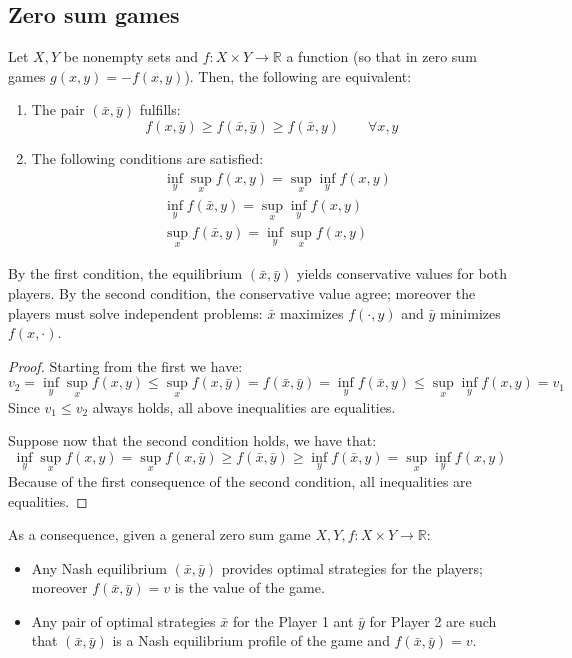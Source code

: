 \subsection{Zero sum games}
\begin{theorem}
    Let $X,Y$ be nonempty sets and $f:X\times Y \rightarrow \mathbb{R}$ a function (so that in zero sum games $g(x,y)=-f(x,y)$). 
    Then, the following are equivalent: 
    \begin{enumerate}
        \item The pair $(\bar{x},\bar{y})$ fulfills: 
            \[f(x,\bar{y})\geq f(\bar{x},\bar{y})\geq f(\bar{x},y)\qquad\forall x,y \]
        \item The following conditions are satisfied: 
        \begin{align*}
            &\inf_y\sup_x f(x,y)=\sup_x\inf_y f(x,y) \\
            &\inf_y f(\bar{x},y)=\sup_x\inf_y f(x,y) \\
            &\sup_x f(\bar{x},y)=\inf_y\sup_x f(x,y)
        \end{align*}
    \end{enumerate}
\end{theorem}
\noindent By the first condition, the equilibrium $(\bar{x},\bar{y})$ yields conservative values for both players. 
By the second condition, the conservative value agree; moreover the players must solve independent problems: $\bar{x}$ maximizes $f(\cdot,y)$ and $\bar{y}$ minimizes $f(x,\cdot)$.
\begin{proof}
    Starting from the first we have: 
    \[v_2=\inf_y\sup_x f(x,y)\leq \sup_x f(x, \bar{y})=f(\bar{x},\bar{y})=\inf_y f(\bar{x},y)\leq \sup_x\inf_y f(x,y)=v_1\]
    Since $v_1\leq v_2$ always holds, all above inequalities are equalities. 

    Suppose now that the second condition holds, we have that: 
    \[\inf_y\sup_x f(x,y)=\sup_x f(x,\bar{y})\geq f(\bar{x},\bar{y})\geq \inf_y f(\bar{x},y)=\sup_x\inf_y f(x,y)\]
    Because of the first consequence of the second condition, all inequalities are equalities. 
\end{proof}
\noindent As a consequence, given a general zero sum game $X,Y,f:X\times Y\rightarrow\mathbb{R}$:
\begin{itemize}
    \item Any Nash equilibrium $(\bar{x},\bar{y})$ provides optimal strategies for the players; moreover $f(\bar{x},\bar{y})=v$ is the value of the game. 
    \item Any pair of optimal strategies $\bar{x}$ for the Player 1 ant $\bar{y}$ for Player 2 are such that $(\bar{x},\bar{y})$ is a Nash equilibrium profile of the game and $f(\bar{x},\bar{y})=v$. 
\end{itemize}